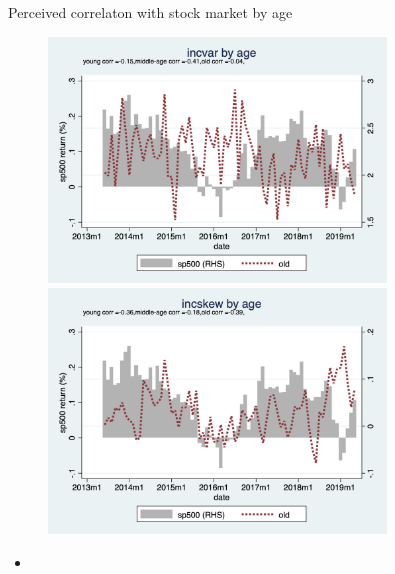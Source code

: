 \documentclass{beamer}
\begin{document}
\begin{frame}{Perceived correlaton with stock market by age}
	\begin{figure}
		\centering
		\label{ts_stk_age_g}
		\includegraphics[width=0.8\textwidth, height=\0.4\textheight]{figures/ts_incvar_age_g_mean_stk} \\
		\includegraphics[width=0.8\textwidth, height=\0.4\textheight]{figures/ts_incskew_age_g_mean_stk} 
	\end{figure}
	\begin{itemize}
		\item 
	\end{itemize}
\end{frame}
\end{document}
